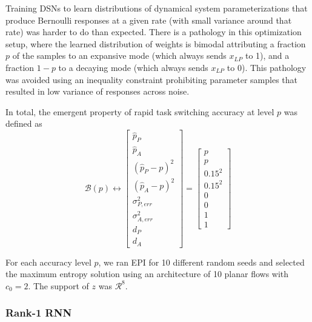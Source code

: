 \documentclass[11pt]{article}
\begin{document}
Training DSNs to learn distributions of dynamical system parameterizations that produce Bernoulli responses at a given rate (with small variance around that rate) was harder to do than expected.  There is a pathology in this optimization setup, where the learned distribution of weights is bimodal attributing a fraction $p$ of the samples to an expansive mode (which always sends $x_{LP}$ to 1), and a fraction $1-p$ to a decaying mode (which always sends $x_{LP}$ to 0).  This pathology was avoided using an inequality constraint prohibiting parameter samples that resulted in low variance of responses across noise.

In total, the emergent property of rapid task switching accuracy at level $p$ was defined as
\begin{equation}
\mathcal{B}(p) \leftrightarrow \begin{bmatrix} \hat{p}_P \\ \hat{p}_A \\ (\hat{p}_P-p)^2 \\ (\hat{p}_A - p)^2 \\ \sigma^2_{P,err} \\ \sigma^2_{A,err} \\ d_P \\ d_A \end{bmatrix} = \begin{bmatrix} p \\ p \\ 0.15^2 \\ 0.15^2 \\ 0 \\ 0 \\ 1 \\ 1 \end{bmatrix}
\end{equation}

For each accuracy level $p$, we ran EPI for 10 different random seeds and selected the maximum entropy solution using an architecture of 10 planar flows with $c_0 = 2$. The support of $z$ was $\mathcal{R}^8$.

\subsubsection{Rank-1 RNN}\label{methods_LRRNN}
\end{document}
